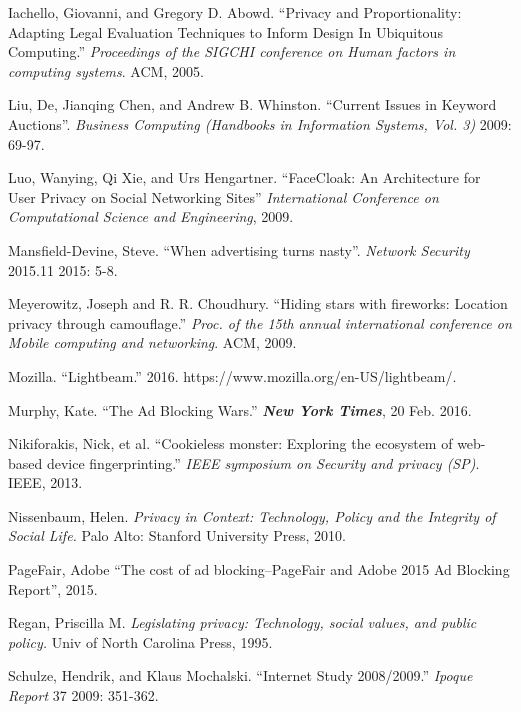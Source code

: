 \documentclass[conference]{IEEEtran}
\begin{document}
\begin{thebibliography}{99}
 Iachello, Giovanni, and Gregory D. Abowd. “Privacy and Proportionality: Adapting Legal Evaluation Techniques to Inform Design In Ubiquitous Computing.” \textit{Proceedings of the SIGCHI conference on Human factors in computing systems}. ACM, 2005.

 Liu, De, Jianqing Chen, and Andrew B. Whinston. “Current Issues in Keyword Auctions”. \textit{Business Computing (Handbooks in Information Systems, Vol. 3)} 2009: 69-97.

 Luo, Wanying, Qi Xie, and Urs Hengartner. “FaceCloak: An Architecture for User Privacy on Social Networking Sites” \textit{International Conference on Computational Science and Engineering}, 2009.

 Mansfield-Devine, Steve. “When advertising turns nasty”. \textit{Network Security} 2015.11 2015: 5-8.

 Meyerowitz, Joseph and R. R. Choudhury. “Hiding stars with fireworks: Location privacy through camouflage.” \textit{Proc. of the 15th annual international conference on Mobile computing and networking}. ACM, 2009.

 Mozilla. “Lightbeam.” 2016. https://www.mozilla.org/en-US/lightbeam/.

 Murphy, Kate. “The Ad Blocking Wars.” \textbf{\textit{New York Times}}, 20 Feb. 2016.

 Nikiforakis, Nick, et al. “Cookieless monster: Exploring the ecosystem of web-based device fingerprinting.” \textit{IEEE symposium on Security and privacy (SP)}. IEEE, 2013.

 Nissenbaum, Helen. \textit{Privacy in Context: Technology, Policy and the Integrity of Social Life.} Palo Alto: Stanford University Press, 2010.

 PageFair, Adobe “The cost of ad blocking–PageFair and Adobe 2015 Ad Blocking Report”, 2015.


 Regan, Priscilla M. \textit{Legislating privacy: Technology, social values, and public policy.} Univ of North Carolina Press, 1995.

 Schulze, Hendrik, and Klaus Mochalski. “Internet Study 2008/2009.” \textit{Ipoque Report} 37 2009: 351-362.


\end{thebibliography}
\end{document}
